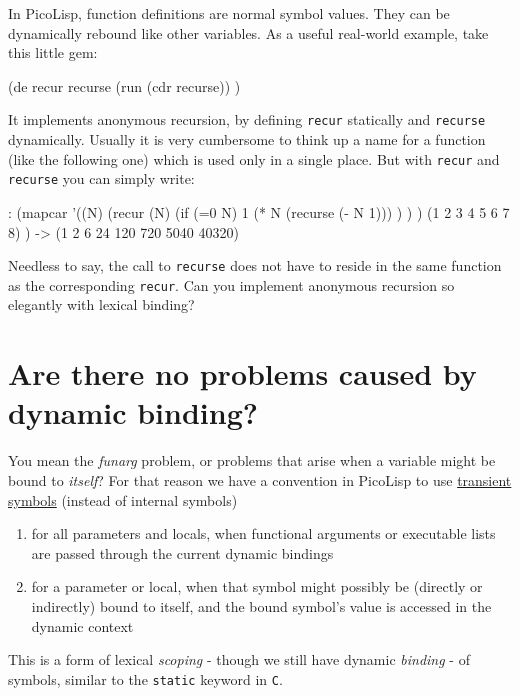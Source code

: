 In PicoLisp, function definitions are normal symbol values. They can be
dynamically rebound like other variables. As a useful real-world
example, take this little gem:


\begin{wideverbatim}
(de recur recurse
   (run (cdr recurse)) )
\end{wideverbatim}

It implements anonymous recursion, by defining \texttt{recur} statically and
\texttt{recurse} dynamically. Usually it is very cumbersome to think up a name
for a function (like the following one) which is used only in a single
place. But with \texttt{recur} and \texttt{recurse} you can simply write:


\begin{wideverbatim}
: (mapcar
   '((N)
      (recur (N)
         (if (=0 N)
            1
            (* N (recurse (- N 1))) ) ) )
   (1 2 3 4 5 6 7 8) )
-> (1 2 6 24 120 720 5040 40320)
\end{wideverbatim}

Needless to say, the call to \texttt{recurse} does not have to reside in the
same function as the corresponding \texttt{recur}. Can you implement anonymous
recursion so elegantly with lexical binding?

 
\section{Are there no problems caused by dynamic binding?}
\label{sec:faq-are-there-no-problems-caused-by-dynamic-binding?}


You mean the \emph{funarg} problem, or problems that arise when a variable
might be bound to \emph{itself}? For that reason we have a convention in
PicoLisp to use \hyperref[ref.html-transient-io]{transient symbols} (instead of
internal symbols)

\begin{enumerate}
\item for all parameters and locals, when functional arguments or
   executable lists are passed through the current dynamic bindings
\item for a parameter or local, when that symbol might possibly be
   (directly or indirectly) bound to itself, and the bound symbol's
   value is accessed in the dynamic context
\end{enumerate}

This is a form of lexical \emph{scoping} - though we still have dynamic
\emph{binding} - of symbols, similar to the \texttt{static} keyword in \texttt{C}.

